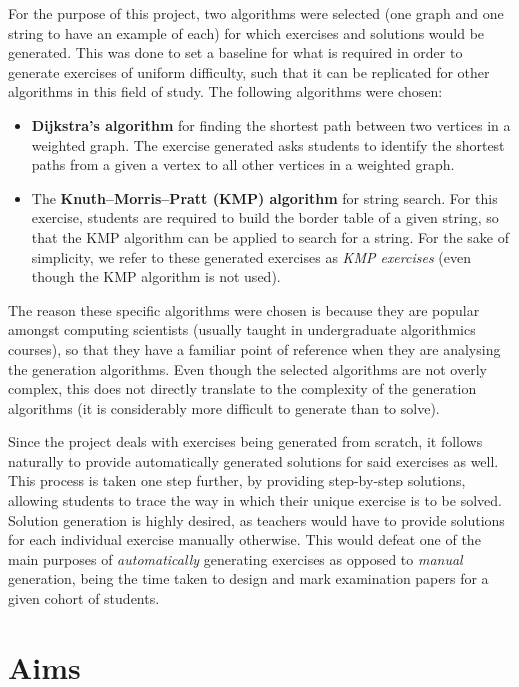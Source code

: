 \documentclass{l4proj}
\begin{document}
For the purpose of this project, two algorithms were selected (one graph and one string to have an example of each) for which exercises and solutions would be generated. This was done to set a baseline for what is required in order to generate exercises of uniform difficulty, such that it can be replicated for other algorithms in this field of study. The following algorithms were chosen:
\begin{itemize}
	\item
	\textbf{Dijkstra's algorithm} for finding the shortest path between two vertices in a weighted graph. The exercise generated asks students to identify the shortest paths from a given a vertex to all other vertices in a weighted graph.
	\item
	The \textbf{Knuth–Morris–Pratt (KMP) algorithm} for string search. For this exercise, students are required to build the border table of a given string, so that the KMP algorithm can be applied to search for a string. For the sake of simplicity, we refer to these generated exercises as \emph{KMP exercises} (even though the KMP algorithm is not used).
\end{itemize}
The reason these specific algorithms were chosen is because they are popular amongst computing scientists (usually taught in undergraduate algorithmics courses), so that they have a familiar point of reference when they are analysing the generation algorithms. Even though the selected algorithms are not overly complex, this does not directly translate to the complexity of the generation algorithms (it is considerably more difficult to generate than to solve). 

Since the project deals with exercises being generated from scratch, it follows naturally to provide automatically generated solutions for said exercises as well. This process is taken one step further, by providing step-by-step solutions, allowing students to trace the way in which their unique exercise is to be solved. Solution generation is highly desired, as teachers would have to provide solutions for each individual exercise manually otherwise. This would defeat one of the main purposes of \emph{automatically} generating exercises as opposed to \emph{manual} generation, being the time taken to design and mark examination papers for a given cohort of students.

\section{Aims}
\label{sec:aim}
\end{document}
